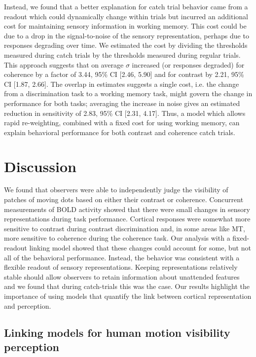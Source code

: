 Instead, we found that a better explanation for catch trial behavior came from a readout which could dynamically change within trials but incurred an additional cost for maintaining sensory information in working memory. This cost could be due to a drop in the signal-to-noise of the sensory representation, perhaps due to responses degrading over time. We estimated the cost by dividing the thresholds measured during catch trials by the thresholds measured during regular trials. This approach suggests that on average $\sigma$ increased (or responses degraded) for coherence by a factor of 3.44, 95\% CI [2.46, 5.90] and for contrast by 2.21, 95\% CI [1.87, 2.66]. The overlap in estimates suggests a single cost, i.e. the change from a discrimination task to a working memory task, might govern the change in performance for both tasks; averaging the increase in noise gives an estimated reduction in sensitivity of 2.83, 95\% CI [2.31, 4.17]. Thus, a model which allows rapid re-weighting, combined with a fixed cost for using working memory, can explain behavioral performance for both contrast and coherence catch trials.

\section{Discussion}

We found that observers were able to independently judge the visibility of patches of moving dots based on either their contrast or coherence. Concurrent measurements of BOLD activity showed that there were small changes in sensory representations during task performance. Cortical responses were somewhat more sensitive to contrast during contrast discrimination and, in some areas like MT, more sensitive to coherence during the coherence task. Our analysis with a fixed-readout linking model showed that these changes could account for some, but not all of the behavioral performance. Instead, the behavior was consistent with a flexible readout of sensory representations. Keeping representations relatively stable should allow observers to retain information about unattended features and we found that during catch-trials this was the case. Our results highlight the importance of using models that quantify the link between cortical representation and perception.

\subsection{Linking models for human motion visibility perception}

